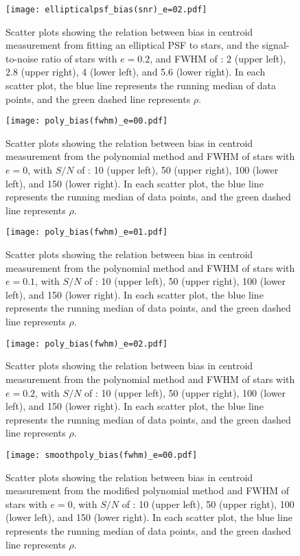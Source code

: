 \documentclass[12pt, preprint]{aastex}
\begin{document}
\begin{figure}[!htb]
  \texttt{[image: ellipticalpsf\_bias(snr)\_e=02.pdf]}
\endminipage
\caption{Scatter plots showing the relation between bias in centroid measurement from fitting an elliptical PSF to stars, and the signal-to-noise ratio of stars with $e=0.2$, and FWHM of : 2 (upper left), 2.8 (upper right), 4 (lower left), and 5.6 (lower right). In each scatter plot, the blue line represents the running median of data points, and the green dashed line represents $\rho$.}\label{15}
\end{figure}


\begin{figure}[!htb]

  \texttt{[image: poly\_bias(fwhm)\_e=00.pdf]}
\endminipage
\caption{Scatter plots showing the relation between bias in centroid measurement from the polynomial method and FWHM of stars with $e=0$, with $S/N$  of : 10 (upper left), 50 (upper right), 100 (lower left), and 150 (lower right). In each scatter plot, the blue line represents the running median of data points, and the green dashed line represents $\rho$.}\label{16}
\end{figure}

\begin{figure}[!htb]
  \texttt{[image: poly\_bias(fwhm)\_e=01.pdf]}
\endminipage
\caption{Scatter plots showing the relation between bias in centroid measurement from the polynomial method and FWHM of stars with $e=0.1$, with $S/N$  of : 10 (upper left), 50 (upper right), 100 (lower left), and 150 (lower right). In each scatter plot, the blue line represents the running median of data points, and the green dashed line represents $\rho$.}\label{17}
\end{figure}

\begin{figure}[!htb]
  \texttt{[image: poly\_bias(fwhm)\_e=02.pdf]}
\endminipage
\caption{Scatter plots showing the relation between bias in centroid measurement from the polynomial method and FWHM of stars with $e=0.2$, with $S/N$  of : 10 (upper left), 50 (upper right), 100 (lower left), and 150 (lower right). In each scatter plot, the blue line represents the running median of data points, and the green dashed line represents $\rho$.}\label{18}
\end{figure}

\begin{figure}[!htb]
  \texttt{[image: smoothpoly\_bias(fwhm)\_e=00.pdf]}
\endminipage
\caption{Scatter plots showing the relation between bias in centroid measurement from the modified polynomial method and FWHM of stars with $e=0$, with $S/N$  of : 10 (upper left), 50 (upper right), 100 (lower left), and 150 (lower right). In each scatter plot, the blue line represents the running median of data points, and the green dashed line represents $\rho$.}\label{19}
\end{figure}
\end{document}
